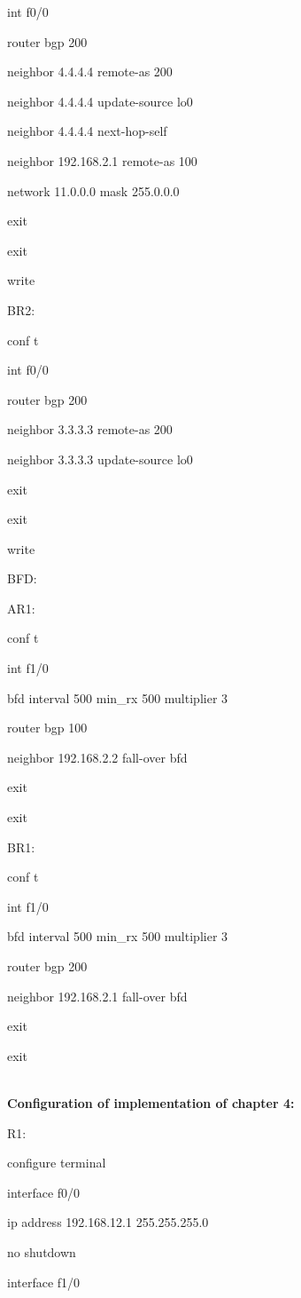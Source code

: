 \documentclass[12pt]{article}
\begin{document}
int f0/0

router bgp 200

neighbor 4.4.4.4 remote-as 200

neighbor 4.4.4.4 update-source lo0

neighbor 4.4.4.4 next-hop-self

neighbor 192.168.2.1 remote-as 100

network 11.0.0.0 mask 255.0.0.0

exit

exit

write

\noindent BR2:

conf t

int f0/0

router bgp 200

neighbor 3.3.3.3 remote-as 200

neighbor 3.3.3.3 update-source lo0

exit

exit

write


\noindent BFD:

\noindent AR1:

conf t

int f1/0

bfd interval 500 min\_rx 500 multiplier 3

router bgp 100 

neighbor 192.168.2.2 fall-over bfd

exit

exit

\noindent BR1:

conf t

int f1/0

bfd interval 500 min\_rx 500 multiplier 3

router bgp 200 

neighbor 192.168.2.1 fall-over bfd

exit

exit
 
~\\
\noindent \textbf{Configuration of implementation of chapter 4:}

\noindent R1:

configure terminal

interface f0/0

ip address 192.168.12.1 255.255.255.0

no shutdown

interface f1/0
\end{document}
